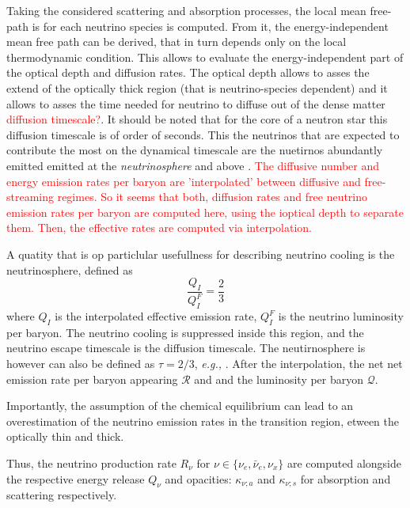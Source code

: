 \documentclass[11pt,a4paper,headinclude=true,DIV=14,BCOR=8mm,chapterprefix,listof=totoc,twoside,openright,abstracton]{scrbook}
\newcommand{\red}[1]{\textcolor{red}{#1}}
\begin{document}
Taking the considered scattering and absorption processes, the local mean free-path is for each neutrino species is computed. From it, the energy-independent mean free path can be derived, that in turn depends only on the local thermodynamic condition. This allows to evaluate the energy-independent part of the optical depth and diffusion rates.
The optical depth allows to asses the extend of the optically thick region (that is neutrino-species dependent) and it allows to asses the time needed for neutrino to diffuse out of the dense matter \red{diffusion timescale?}. 
It should be noted that for the core of a neutron star this diffusion timescale is of order of seconds. This the neutrinos that are expected to contribute the most on the dynamical timescale are the nuetirnos abundantly emitted emitted at the \textit{neutrinosphere} and above \cite{Galeazzi:2013mia,Endrizzi:2018uwl}.
\red{The diffusive number and energy emission rates per baryon are 'interpolated' between diffusive and free-streaming regimes.
    So it seems that both, diffusion rates and free neutrino emission rates per baryon are computed here, using the ioptical depth to separate them. Then, the effective rates are computed via interpolation.}

A quatity that is op particlular usefullness for describing neutrino cooling  is the neutrinosphere,
defined as \cite{Galeazzi:2013mia}
\begin{equation}
\frac{Q_I}{Q_{I}^F} = \frac{2}{3}
\end{equation}
where $Q_I$ is the interpolated effective emission rate, $Q_I^F$ is the neutrino luminosity per baryon.
The neutrino cooling is suppressed inside this region, and the neutrino escape timescale is the diffusion timescale. 
The neutirnosphere is however can also be defined as $\tau=2/3$, \textit{e.g.,} \cite{Rosswog:2003rv,Endrizzi:2018uwl}.
After the interpolation, the net net emission rate per baryon appearing $\mathcal{R}$ and and the luminosity per baryon $\mathcal{Q}$.

Importantly, the assumption of the chemical equilibrium can lead to an overestimation of the neutrino emission rates in the transition region, etween the optically thin and thick.


Thus, the neutrino production rate $R_{\nu}$ for $\nu\in\{\nu_e,\bar{\nu}_e,\nu_x\}$ are computed alongside the respective energy release $Q_{\nu}$ and opacities: $\kappa_{\nu;a}$ and $\kappa_{\nu;s}$ for absorption and scattering respectively.
\end{document}
